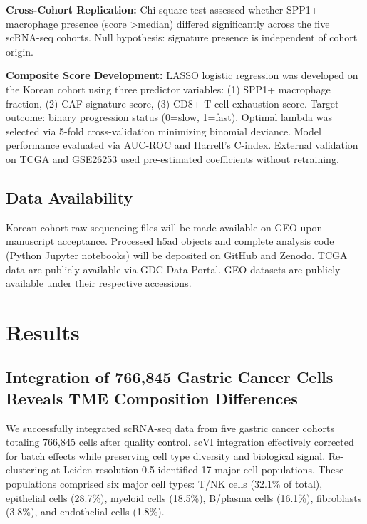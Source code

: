 \documentclass[12pt,twoside]{article}
\begin{document}
\textbf{Cross-Cohort Replication:} Chi-square test assessed whether SPP1+ macrophage presence (score >median) differed significantly across the five scRNA-seq cohorts. Null hypothesis: signature presence is independent of cohort origin.

\textbf{Composite Score Development:} LASSO logistic regression was developed on the Korean cohort using three predictor variables: (1) SPP1+ macrophage fraction, (2) CAF signature score, (3) CD8+ T cell exhaustion score. Target outcome: binary progression status (0=slow, 1=fast). Optimal lambda was selected via 5-fold cross-validation minimizing binomial deviance. Model performance evaluated via AUC-ROC and Harrell's C-index. External validation on TCGA and GSE26253 used pre-estimated coefficients without retraining.

\subsection{Data Availability}

Korean cohort raw sequencing files will be made available on GEO upon manuscript acceptance. Processed h5ad objects and complete analysis code (Python Jupyter notebooks) will be deposited on GitHub and Zenodo. TCGA data are publicly available via GDC Data Portal. GEO datasets are publicly available under their respective accessions.


\section{Results}

\subsection{Integration of 766,845 Gastric Cancer Cells Reveals TME Composition Differences}

We successfully integrated scRNA-seq data from five gastric cancer cohorts totaling 766,845 cells after quality control. scVI integration effectively corrected for batch effects while preserving cell type diversity and biological signal. Re-clustering at Leiden resolution 0.5 identified 17 major cell populations. These populations comprised six major cell types: T/NK cells (32.1\% of total), epithelial cells (28.7\%), myeloid cells (18.5\%), B/plasma cells (16.1\%), fibroblasts (3.8\%), and endothelial cells (1.8\%).
\end{document}
